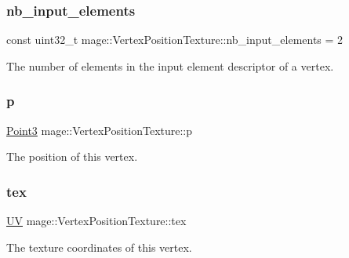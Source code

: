 \subsubsection{\texorpdfstring{nb\+\_\+input\+\_\+elements}{nb\_input\_elements}}
{\footnotesize\ttfamily const uint32\+\_\+t mage\+::\+Vertex\+Position\+Texture\+::nb\+\_\+input\+\_\+elements = 2\hspace{0.3cm}{\ttfamily [static]}}

The number of elements in the input element descriptor of a vertex. \hypertarget{structmage_1_1_vertex_position_texture_a49253c4db52d1a4905838ba6ed6c52c6}{}\label{structmage_1_1_vertex_position_texture_a49253c4db52d1a4905838ba6ed6c52c6} 
\subsubsection{\texorpdfstring{p}{p}}
{\footnotesize\ttfamily \hyperlink{structmage_1_1_point3}{Point3} mage\+::\+Vertex\+Position\+Texture\+::p}

The position of this vertex. \hypertarget{structmage_1_1_vertex_position_texture_a9b4efa25d268c812892ecffc2582496e}{}\label{structmage_1_1_vertex_position_texture_a9b4efa25d268c812892ecffc2582496e} 
\subsubsection{\texorpdfstring{tex}{tex}}
{\footnotesize\ttfamily \hyperlink{structmage_1_1_u_v}{UV} mage\+::\+Vertex\+Position\+Texture\+::tex}

The texture coordinates of this vertex. 